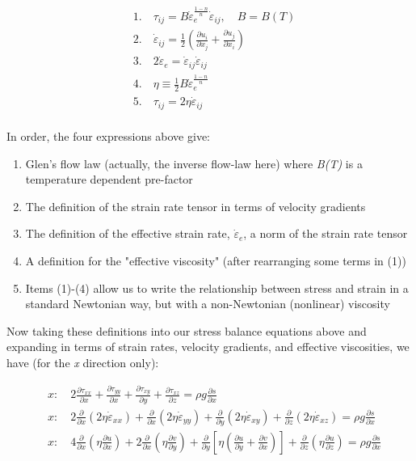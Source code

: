 \begin{align*}
  & 1.\quad \tau _{ij}=B\dot{\varepsilon }_{e}^{\frac{1-n}{n}}\dot{\varepsilon }_{ij},\quad B=B(T) \\ 
 & 2.\quad \dot{\varepsilon }_{ij}=\frac{1}{2}\left( \frac{\partial u_{i}}{\partial x_{j}}+\frac{\partial u_{j}}{\partial x_{i}} \right) \\ 
 & 3.\quad 2\dot{\varepsilon }_{e}=\dot{\varepsilon }_{ij}\dot{\varepsilon }_{ij} \\ 
 & 4.\quad \eta \equiv \frac{1}{2}B\dot{\varepsilon }_{e}^{\frac{1-n}{n}} \\ 
 & 5.\quad \tau _{ij}=2\eta \dot{\varepsilon }_{ij} \\ 
\end{align*}

In order, the four expressions above give: 

\begin{enumerate}
\item  Glen's flow law (actually, the inverse flow-law here) where \textit{B(T)} is a temperature dependent pre-factor
\item  The definition of the strain rate tensor in terms of velocity gradients
\item  The definition of the effective strain rate, $\dot{\varepsilon }_{e}$, a norm of the strain rate tensor
\item  A definition for the "effective viscosity" (after rearranging some terms in (1))
\item  Items (1)-(4) allow us to write the relationship between stress and strain in a standard Newtonian way, but with a non-Newtonian (nonlinear) viscosity
\end{enumerate}

Now taking these definitions into our stress balance equations above and expanding in terms of strain rates, velocity gradients, and effective viscosities, we have (for the \textit{x} direction only):

\begin{align*}
  & x:\quad 2\frac{\partial \tau _{xx}}{\partial x}+\frac{\partial \tau _{yy}}{\partial x}+\frac{\partial \tau _{xy}}{\partial y}+\frac{\partial \tau _{xz}}{\partial z}=\rho g\frac{\partial s}{\partial x} \\ 
 & x:\quad 2\frac{\partial }{\partial x}\left( 2\eta \dot{\varepsilon }_{xx} \right)+\frac{\partial }{\partial x}\left( 2\eta \dot{\varepsilon }_{yy} \right)+\frac{\partial }{\partial y}\left( 2\eta \dot{\varepsilon }_{xy} \right)+\frac{\partial }{\partial z}\left( 2\eta \dot{\varepsilon }_{xz} \right)=\rho g\frac{\partial s}{\partial x} \\ 
 & x:\quad 4\frac{\partial }{\partial x}\left( \eta \frac{\partial u}{\partial x} \right)+2\frac{\partial }{\partial x}\left( \eta \frac{\partial v}{\partial y} \right)+\frac{\partial }{\partial y}\left[ \eta \left( \frac{\partial u}{\partial y}+\frac{\partial v}{\partial x} \right) \right]+\frac{\partial }{\partial z}\left( \eta \frac{\partial u}{\partial z} \right)=\rho g\frac{\partial s}{\partial x} \\ 
\end{align*}


